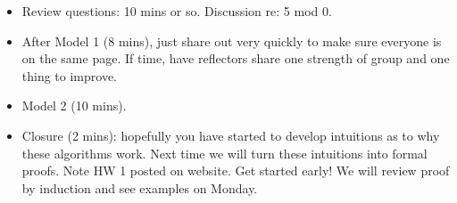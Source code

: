 \documentclass{tufte-handout}
\begin{document}
\begin{itemize}
\item Review questions: 10 mins or so.  Discussion re: 5 mod 0.

\item After Model 1 (8 mins), just share out very quickly to make sure
  everyone is on the same page.  If time, have reflectors share one
  strength of group and one thing to improve.

\item Model 2 (10 mins).

\item Closure (2 mins): hopefully you have started to develop
  intuitions as to why these algorithms work.  Next time we will turn
  these intuitions into formal proofs.  Note HW 1 posted on website.
  Get started early!  We will review proof by induction and see
  examples on Monday.

\end{itemize}
\end{document}
